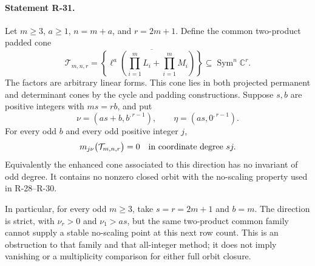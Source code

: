 \paragraph{Statement R-31.}
Let $m\geq3$, $a\geq1$, $n=m+a$, and $r=2m+1$. Define the
common two-product padded cone
\[
 \mathcal T_{m,n,r}
 =\overline{\left\{\ell^a\left(\prod_{i=1}^m L_i+
                         \prod_{i=1}^m M_i\right)\right\}}
                       \subseteq\operatorname{Sym}^n\mathbb C^r.
\]
The factors are arbitrary linear forms. This cone lies in both
projected permanent and determinant cones by the cycle and
padding constructions. Suppose $s,b$ are positive integers with
$ms=rb$, and put
\[
 \nu=(as+b,b^{,r-1}),\qquad \eta=(as,0^{,r-1}).
\]
For every odd $b$ and every odd positive integer $j$,
\begin{equation}\label{R31:odd_vanishing}
 m_{j\nu}\bigl(\mathcal T_{m,n,r}\bigr)=0
       \quad\hbox{in coordinate degree }sj.
\end{equation}
Equivalently the enhanced cone associated to this direction
has no invariant of odd degree. It contains no nonzero closed
orbit with the no-scaling property used in R-28--R-30.

In particular, for every odd $m\geq3$, take $s=r=2m+1$ and
$b=m$. The direction is strict, with $\nu_r>0$ and $\nu_1>as$,
but the same two-product common family cannot supply a stable
no-scaling point at this next row count. This is an obstruction
to that family and that all-integer method; it does not imply
vanishing or a multiplicity comparison for either full orbit
closure.

